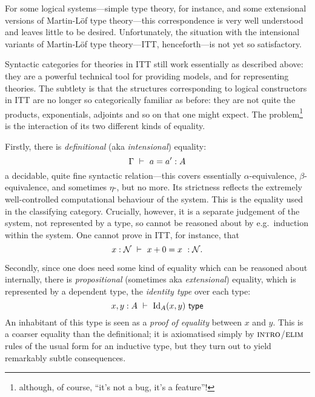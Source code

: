\begin{para}
For some logical systems---simple type theory, for instance, and some extensional versions of Martin-Löf type theory---this correspondence is very well understood and leaves little to be desired.  Unfortunately, the situation with the intensional variants of Martin-Löf type theory---ITT, henceforth---is not yet so satisfactory.

Syntactic categories for theories in ITT still work essentially as described above: they are a powerful technical tool for providing models, and for representing theories.  The subtlety is that the structures corresponding to logical constructors in ITT are no longer so categorically familiar as before: they are not quite the products, exponentials, adjoints and so on that one might expect.  The problem\footnote{although, of course, ``it's not a bug, it's a feature''!} is the interaction of its two different kinds of equality.

Firstly, there is \emph{definitional} (aka \emph{intensional}) equality:
\[\Gamma\ \vdash\ a = a' : A\]
a decidable, quite fine syntactic relation---this covers essentially $\alpha$-equivalence, $\beta$-equivalence, and sometimes $\eta$-, but no more.  Its strictness reflects the extremely well-controlled computational behaviour of the system.  This is the equality used in the classifying category.  Crucially, however, it is a separate judgement of the system, not represented by a type, so cannot be reasoned about by e.g.\ induction within the system.  One cannot prove in ITT, for instance, that 
\[x : \mathcal{N}\ \vdash\ x+0 = x\ : \mathcal{N}. \]

Secondly, since one does need some kind of equality which can be reasoned about internally, there is \emph{propositional} (sometimes aka \emph{extensional}) equality, which is represented by a dependent type, the \emph{identity type} over each type:
\[ x, y : A\ \vdash\ \mathrm{Id}_A(x,y)\ \mathsf{type}\]
An inhabitant of this type is seen as a \emph{proof of equality} between $x$ and $y$.  This is a coarser equality than the definitional; it is axiomatised simply by $\textsc{intro}$/$\textsc{elim}$ rules of the usual form for an inductive type, but they turn out to yield remarkably subtle consequences.
\end{para}

